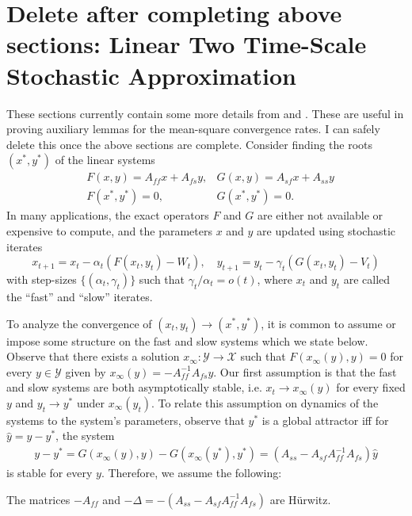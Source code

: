 

\section{{\color{red}Delete after completing above sections:} Linear Two Time-Scale Stochastic Approximation}
{\color{red}These sections currently contain some more details from \citep{konda2004convergence} and \citep{kaledin2020finite}. 
These are useful in proving auxiliary lemmas for the mean-square convergence rates.
I can safely delete this once the above sections are complete. 
}
Consider finding the roots $(x^*, y^*)$ of the linear systems
\begin{align*}
    &F(x, y) = A_{ff} x + A_{fs} y , 
    &G(x, y) = A_{sf} x + A_{ss} y    \\
    &F(x^*, y^*) = 0 , 
    &G(x^*, y^*) = 0  .
\end{align*}
In many applications, the exact operators $F$ and $G$ are either not available or expensive to compute, and the parameters $x$ and $y$ are updated using stochastic iterates
\begin{equation}\label{eq:updates}
    x_{t+1} = x_t - \alpha_t (F(x_t, y_t) - W_t) , \quad y_{t+1} = y_t - \gamma_t (G(x_t, y_t) - V_t) 
\end{equation}
with step-sizes $\{(\alpha_t, \gamma_t)\}$ such that $\gamma_t/\alpha_t = o(t)$, where $x_t$ and $y_t$ are called the ``fast'' and ``slow'' iterates.


To analyze the convergence of $(x_t, y_t) \to (x^*, y^*)$, it is common to assume or impose some structure on the fast and slow systems \citep{konda2004convergence} which we state below.
Observe that there exists a solution $x_\infty: \mathcal{Y} \to \mathcal{X}$ such that $F(x_\infty (y), y) = 0$ for every $y \in \mathcal{Y}$ given by $x_{\infty} (y) = -A_{ff}^{-1} A_{fs} y$.
Our first assumption is that the fast and slow systems are both asymptotically stable, i.e. $x_t \to x_\infty (y)$ for every fixed $y$ and $y_t \to y^*$ under $x_\infty (y_t)$.
To relate this assumption on dynamics of the systems to the system's parameters, observe that $y^*$ is a global attractor iff for $\hat{y} = y - y^*$, the system
\begin{align*}
    y - y^* = G(x_\infty (y), y) - G(x_{\infty}(y^*), y^*) =
    (A_{ss} -A_{sf} A_{ff}^{-1} A_{fs}) \hat{y} 
\end{align*}
is stable for every $y$.
Therefore, we assume the following:
\begin{assumption}
    The matrices $-A_{ff}$ and $-\Delta = -(A_{ss} - A_{sf} A_{ff}^{-1} A_{fs})$ are H\"{u}rwitz.
\end{assumption}


